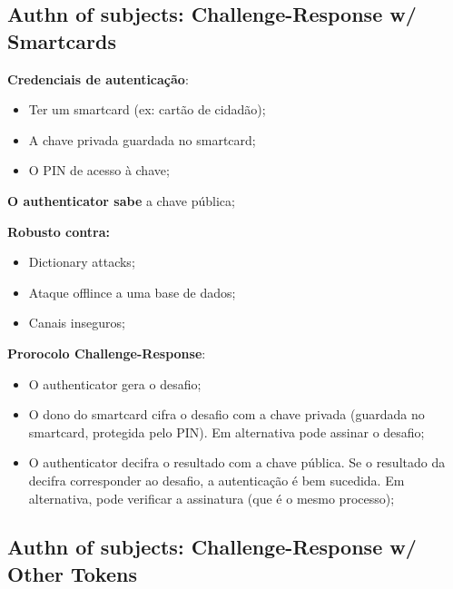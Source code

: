 \documentclass{article}
\begin{document}
\subsection{Authn of subjects: Challenge-Response w/ Smartcards}

\begin{flushleft}
  \textbf{Credenciais de autenticação}:
  \begin{itemize}
    \item Ter um smartcard (ex: cartão de cidadão);
    \item A chave privada guardada no smartcard;
    \item O PIN de acesso à chave;
  \end{itemize}

  \textbf{O authenticator sabe} a chave pública;

  \vspace{2mm}

  \textbf{Robusto contra:}
  \begin{itemize}
    \item Dictionary attacks;
    \item Ataque offlince a uma base de dados;
    \item Canais inseguros;
  \end{itemize}

  \vspace{2mm}

  \textbf{Prorocolo Challenge-Response}:
  \begin{itemize}
    \item O authenticator gera o desafio;
    \item O dono do smartcard cifra o desafio com a chave privada
    (guardada no smartcard, protegida pelo PIN). Em alternativa pode assinar o desafio;
    \item O authenticator decifra o resultado com a chave pública.
    Se o resultado da decifra corresponder ao desafio, a autenticação é bem sucedida. Em alternativa,
    pode verificar a assinatura (que é o mesmo processo);
  \end{itemize}
\end{flushleft}

\pagebreak

\subsection{Authn of subjects: Challenge-Response w/ Other Tokens}
\end{document}

